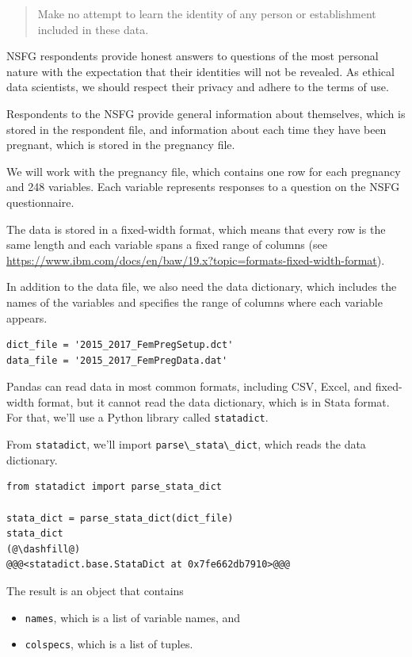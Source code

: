 \begin{quote}
Make no attempt to learn the identity of any person or establishment
included in these data.
\end{quote}

NSFG respondents provide honest answers to questions of the most
personal nature with the expectation that their identities will not be
revealed. As ethical data scientists, we should respect their privacy
and adhere to the terms of use.

Respondents to the NSFG provide general information about themselves,
which is stored in the respondent file, and information about each time
they have been pregnant, which is stored in the pregnancy file.

We will work with the pregnancy file, which contains one row for each
pregnancy and 248 variables. Each variable represents responses to a
question on the NSFG questionnaire.

The data is stored in a fixed-width format, which means that every row
is the same length and each variable spans a fixed range of columns (see
\url{https://www.ibm.com/docs/en/baw/19.x?topic=formats-fixed-width-format}).

In addition to the data file, we also need the data dictionary, which
includes the names of the variables and specifies the range of columns
where each variable appears.

\begin{lstlisting}[]
dict_file = '2015_2017_FemPregSetup.dct'
data_file = '2015_2017_FemPregData.dat'
\end{lstlisting}

Pandas can read data in most common formats, including CSV, Excel, and
fixed-width format, but it cannot read the data dictionary, which is in
Stata format. For that, we'll use a Python library called
\passthrough{\lstinline!statadict!}.

From \passthrough{\lstinline!statadict!}, we'll import
\passthrough{\lstinline!parse\_stata\_dict!}, which reads the data
dictionary.

\begin{lstlisting}[]
from statadict import parse_stata_dict

stata_dict = parse_stata_dict(dict_file)
stata_dict
(@\dashfill@)
@@@<statadict.base.StataDict at 0x7fe662db7910>@@@
\end{lstlisting}

The result is an object that contains

\begin{itemize}
\item
  \passthrough{\lstinline!names!}, which is a list of variable names,
  and
\item
  \passthrough{\lstinline!colspecs!}, which is a list of tuples.
\end{itemize}

